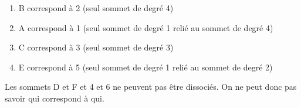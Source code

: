 \begin{Exercice}[5 minutes]
\begin{conseil}
    \end{conseil}
    \begin{solution}
        \begin{enumerate}
            \item B correspond à 2 (seul sommet de degré 4)
            \item A correspond à 1 (seul sommet de degré 1 relié au sommet de degré 4)
            \item C correspond à 3 (seul sommet de degré 3)
            \item E correspond à 5 (seul sommet de degré 1 relié au sommet de degré 2)
        \end{enumerate}
        Les sommets D et F et 4 et 6 ne peuvent pas être dissociés. On ne peut donc pas savoir qui correspond à qui.
    \end{solution}
\end{Exercice}




